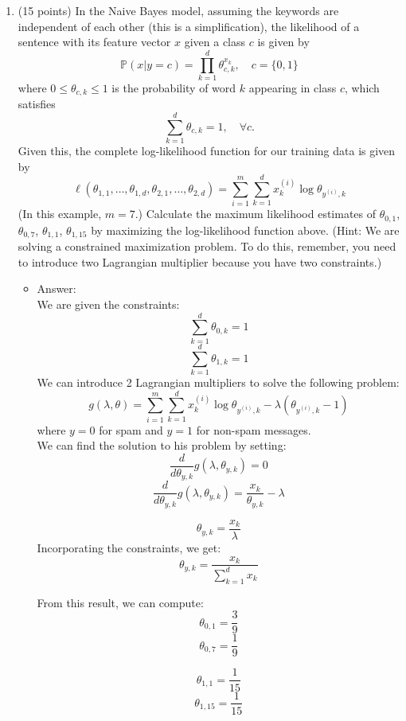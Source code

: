 \documentclass[twoside,10pt]{article}
\begin{document}
\begin{enumerate}
\begin{enumerate}
\item (15 points) In the Naive Bayes model, assuming the keywords are independent of each other (this is a simplification), the likelihood of a sentence with its feature vector $x$ given a class $c$ is given by 
\[
\mathbb P (x|y = c) = \prod_{k=1}^d \theta_{c, k}^{x_k}, \quad c = \{0, 1\}
\]
where $0 \leq \theta_{c,k} \leq 1$ is the probability of word $k$ appearing in class $c$, which satisfies 
\[\sum_{k=1}^d \theta_{c, k} = 1, \quad \forall c.\] Given this, the complete log-likelihood function for our training data is given by
\[
\ell(\theta_{1,1}, \ldots, \theta_{1, d}, \theta_{2,1}, \ldots, \theta_{2, d}) = 
\sum_{i=1}^m \sum_{k=1}^d x_k^{(i)} \log \theta_{y^{(i)}, k}
\]
(In this example, $m = 7$.)
 Calculate the maximum likelihood estimates of $\theta_{0,1}$, $\theta_{0,7}$, $\theta_{1,1}$, $\theta_{1,15}$ by maximizing the log-likelihood function above.
 (Hint: We are solving a constrained maximization problem. To do this, remember, you  need to introduce two Lagrangian multiplier because you have two constraints.)
\begin{itemize}
\item Answer:\\
We are given the constraints:
$$\sum_{k=1}^d \theta_{0, k} = 1 $$
$$\sum_{k=1}^d \theta_{1, k} = 1 $$
We can introduce 2 Lagrangian multipliers to solve the following problem:
$$g(\lambda,\theta) = \sum_{i=1}^m \sum_{k=1}^d x_k^{(i)} \log \theta_{y^{(i)}, k} - \lambda(\theta_{y^{(i)}, k} - 1)$$	where $y = 0$ for spam and $y=1$ for non-spam messages.\\
We can find the solution to his problem by setting:
$$\frac{d}{d\theta_{y,k}}g(\lambda,\theta_{y,k}) = 0$$
$$\frac{d}{d\theta_{y,k}}g(\lambda,\theta_{y,k}) = \frac{x_k}{\theta_{y,k}} - \lambda $$

$$\theta_{y,k} = \frac{x_k}{\lambda}$$
Incorporating the constraints, we get:
$$\theta_{y,k} = \frac{x_k}{\sum_{k=1}^d x_k}$$

From this result, we can compute:\\
$$\theta_{0,1} = \frac{3}{9} $$
$$\theta_{0,7} = \frac{1}{9} $$

$$\theta_{1,1} = \frac{1}{15} $$
$$\theta_{1,15} = \frac{1}{15} $$\\




\end{itemize} 
 

\end{enumerate}
\end{enumerate}
\end{document}
